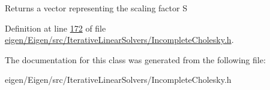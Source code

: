 \begin{DoxyReturn}{Returns}
a vector representing the scaling factor S 
\end{DoxyReturn}


Definition at line \hyperlink{eigen_2_eigen_2src_2_iterative_linear_solvers_2_incomplete_cholesky_8h_source_l00172}{172} of file \hyperlink{eigen_2_eigen_2src_2_iterative_linear_solvers_2_incomplete_cholesky_8h_source}{eigen/\+Eigen/src/\+Iterative\+Linear\+Solvers/\+Incomplete\+Cholesky.\+h}.



The documentation for this class was generated from the following file\+:\begin{DoxyCompactItemize}
\item 
eigen/\+Eigen/src/\+Iterative\+Linear\+Solvers/\+Incomplete\+Cholesky.\+h\end{DoxyCompactItemize}
